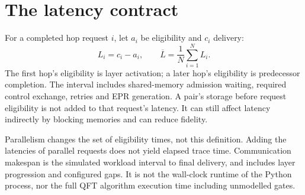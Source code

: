 \documentclass[11pt,a4paper,oneside]{report}
\begin{document}
\section{The latency contract}
For a completed hop request $i$, let $a_i$ be eligibility and $c_i$ delivery:
\[
 L_i=c_i-a_i,\qquad \overline L=\frac{1}{N}\sum_{i=1}^N L_i.
\]
The first hop's eligibility is layer activation; a later hop's eligibility is predecessor completion. The interval includes shared-memory admission waiting, required control exchange, retries and EPR generation. A pair's storage before request eligibility is not added to that request's latency. It can still affect latency indirectly by blocking memories and can reduce fidelity.

Parallelism changes the set of eligibility times, not this definition. Adding the latencies of parallel requests does not yield elapsed trace time. Communication makespan is the simulated workload interval to final delivery, and includes layer progression and configured gaps. It is not the wall-clock runtime of the Python process, nor the full QFT algorithm execution time including unmodelled gates.
\end{document}
